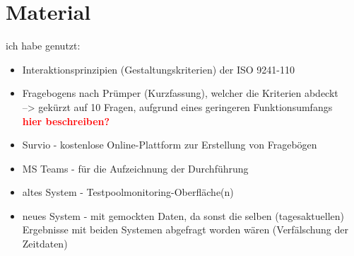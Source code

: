 \section{Material}
ich habe genutzt:
\begin{itemize}
    \item Interaktionsprinzipien (Gestaltungskriterien) der ISO 9241-110
    \item Fragebogens nach Prümper (Kurzfassung\textcolor{red}{\cite{kurzfassung:prümper}}), welcher die Kriterien abdeckt\\
    --> gekürzt auf 10 Fragen, aufgrund eines geringeren Funktionsumfangs\\
    \textcolor{red}{\textbf{hier beschreiben?}}
    \item Survio - kostenlose Online-Plattform zur Erstellung von Fragebögen
    \item MS Teams - für die Aufzeichnung der Durchführung
    \item altes System - Testpoolmonitoring-Oberfläche(n)
    \item neues System - mit gemockten Daten, da sonst die selben (tagesaktuellen) Ergebnisse mit beiden Systemen abgefragt worden wären (Verfälschung der Zeitdaten)
\end{itemize}

